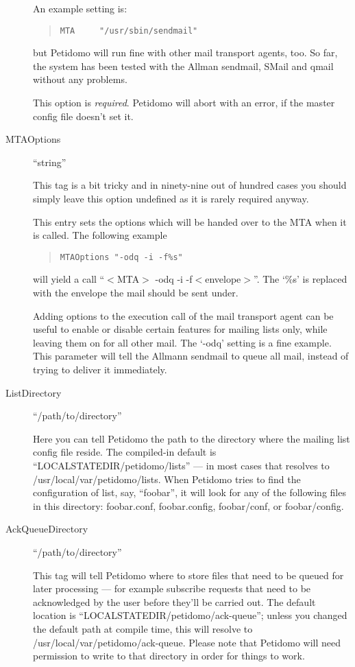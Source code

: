 \documentclass[a4paper,11pt]{scrreprt}
\newcommand{\file}[1]{{\textsf{#1}}}
\begin{document}
\begin{description}
An example setting is:
\begin{quote}
\begin{verbatim}
MTA     "/usr/sbin/sendmail"
\end{verbatim}
\end{quote}
but Petidomo will run fine with other mail transport agents, too. So
far, the system has been tested with the Allman sendmail, SMail and
qmail without any problems.

This option is \emph{required}. Petidomo will abort with an error,
if the master config file doesn't set it.


\item[MTAOptions] \hfill ``string''

This tag is a bit tricky and in ninety-nine out of hundred cases you
should simply leave this option undefined as it is rarely required
anyway.

This entry sets the options which will be handed over to the MTA
when it is called. The following example
\begin{quote}
\begin{verbatim}
MTAOptions "-odq -i -f%s"
\end{verbatim}
\end{quote}
will yield a call ``$<$MTA$>$ -odq -i -f$<$envelope$>$''. The `\%s' is
replaced with the envelope the mail should be sent under.

Adding options to the execution call of the mail transport agent can
be useful to enable or disable certain features for mailing lists
only, while leaving them on for all other mail. The `-odq' setting is
a fine example. This parameter will tell the Allmann sendmail to queue
all mail, instead of trying to deliver it immediately.


\item[ListDirectory] \hfill ``/path/to/directory''

Here you can tell Petidomo the path to the directory where the mailing
list config file reside. The compiled-in default is
``LOCALSTATEDIR/petidomo/lists'' --- in most cases that resolves to
\file{/usr/local/var/petidomo/lists}. When Petidomo tries to find the
configuration of list, say, ``foobar'', it will look for any of the
following files in this directory: \file{foobar.conf},
\file{foobar.config}, \file{foobar/conf}, or \file{foobar/config}.

\item[AckQueueDirectory] \hfill ``/path/to/directory''

This tag will tell Petidomo where to store files that need to be
queued for later processing --- for example subscribe requests that
need to be acknowledged by the user before they'll be carried out. The
default location is ``LOCALSTATEDIR/petidomo/ack-queue''; unless you
changed the default path at compile time, this will resolve to
\file{/usr/local/var/petidomo/ack-queue}. Please note that Petidomo
will need permission to write to that directory in order for things to
work.


\end{description}
\end{document}
